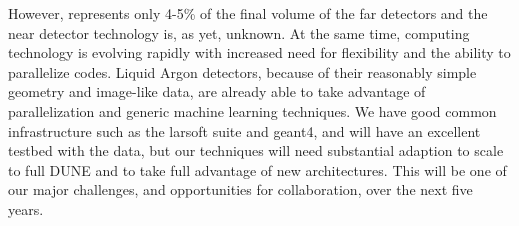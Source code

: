 However,  represents only 4-5\% of the final volume of the far detectors and the near detector technology is, as yet, unknown.  At the same time, computing technology is evolving rapidly with increased need for flexibility and the ability to parallelize codes.  Liquid Argon detectors, because of their reasonably simple geometry and image-like data, are already able to take advantage of parallelization and generic machine learning techniques.  We have good common infrastructure such as the larsoft suite and geant4, and will have an excellent testbed with the  data,  but our techniques will need substantial adaption to scale to full DUNE and to take full advantage of new architectures.  This will be one of our major challenges, and opportunities for collaboration,  over the next five years.

